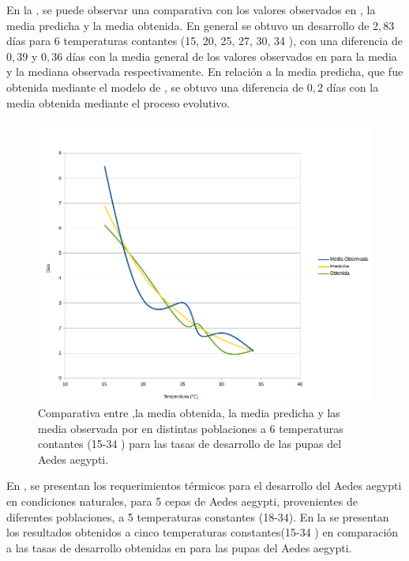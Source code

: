 En la , se puede observar una comparativa con los
valores observados en \cite{rueda1990temperature}, la media predicha y la media obtenida. En
general se obtuvo un desarrollo de $2,83$ días para 6 temperaturas contantes (15, 20, 25, 27,
30, 34 \textcelsius), con una diferencia de $0,39$ y $0,36$ días con la media general de los
valores observados en \cite{rueda1990temperature} para la media y la mediana observada respectivamente. En relación a la media predicha, que fue obtenida mediante el modelo de
\cite{sharpe1977reaction}, se obtuvo una diferencia de $0,2$ días con la media obtenida mediante el
proceso evolutivo.

\begin{figure}[!htbp]
    \centering
    \includegraphics[width=1\textwidth]{capitulo-6/graphics/desarrollo-pupa-rueda.png}
    \caption{\label{fig:desarrollo-pupa-rueda1990}
    Comparativa entre ,la media obtenida, la media predicha y las media observada por \cite{
    rueda1990temperature} en distintas poblaciones a 6 temperaturas contantes (15-34 \textcelsius)
    para las tasas de desarrollo de las pupas del Aedes aegypti.}

\end{figure}


En \cite{BESERRA2006}, se presentan los requerimientos térmicos para el desarrollo del Aedes
aegypti en condiciones naturales, para 5 cepas de Aedes aegypti, provenientes de diferentes
poblaciones, a 5 temperaturas constantes (18-34\textcelsius). En la
 se presentan los resultados obtenidos a cinco
temperaturas constantes(15-34 \textcelsius) en comparación a las tasas de desarrollo obtenidas en
\cite{BESERRA2006} para las pupas del Aedes aegypti.

